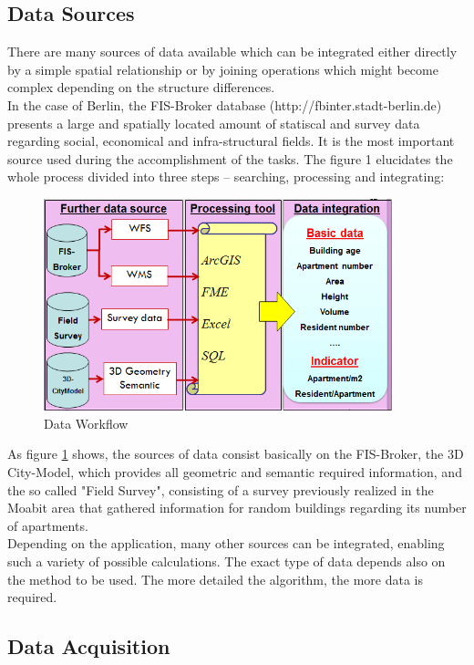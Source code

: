 \documentclass[11pt]{article}
\begin{document}
\subsection{Data Sources}
There are many sources of data available which can be integrated either directly by a simple spatial relationship or by joining operations which might become complex depending on the structure differences.\\ 
In the case of Berlin, the FIS-Broker database (http://fbinter.stadt-berlin.de) presents a large and spatially located amount of statiscal and survey data regarding social, economical and infra-structural fields. It is the most important source used during the accomplishment of the tasks.
The figure 1 elucidates the whole process divided into three steps – searching, processing and integrating:\\
\begin{figure}[ht]
	\centering
	\includegraphics[width=0.9\textwidth]{fig1.png}
	\caption{Data Workflow}
	\label{fig:figure1}
\end{figure}
As figure \ref{fig:figure1} shows, the sources of data consist basically on the FIS-Broker, the 3D City-Model, which provides all geometric and semantic required information, and the so called "Field Survey", consisting of a survey previously realized in the Moabit area that gathered information for random buildings regarding its number of apartments. \\
Depending on the application, many other sources can be integrated, enabling such a variety of possible calculations. The exact type of data depends also on the method to be used. The more detailed the algorithm, the more data is required. 
\subsection{Data Acquisition }
\end{document}
